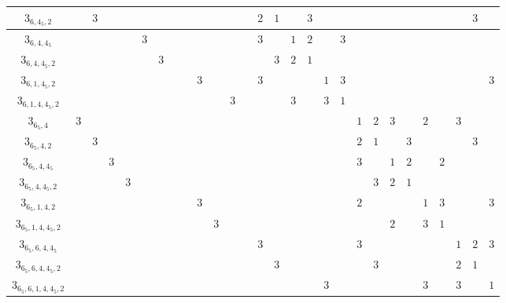 \documentclass{amsart}
\theoremstyle{definition}
\theoremstyle{remark}
\begin{document}
\begin{table}
{\begin{tabular}{|c||c|c|c|c|c|c|c|c|c|c|c|c|c|c|c|c|c|c|c|c|c|c|c|c|c|c|c|}
$3_{6,4_5,2}$ &  & $3$ &  &  &  &  &  &  &  &  &  &  & $2$ & $1$ &  & $3$ &  & & & & & & & & & $3$ & \\ \hline
$3_{6,4,4_5}$ &  &  &  &  & $3$ &  &  &  &  &  &  &  & $3$ &  & $1$ & $2$ &  & $3$ & & & & & & & & &\\ \hline
$3_{6,4,4_5,2}$ &  &  &  &  &  & $3$ &  &  &  &  &  &  &  & $3$ & $2$ & $1$ &  & & & & & & & & & & \\ \hline
$3_{6,1,4_5,2}$ &  &  &  &  &  &  &  &  & $3$ &  &  &  & $3$ &  &  &  & $1$ & $3$ & & & & & & & & & $3$\\ \hline
$3_{6,1,4,4_5,2}$ &  &  &  &  &  &  &  &  &  &  & $3$ &  &  &  & $3$ &  & $3$ & $1$ & & & & & & & & &\\ \hline
$3_{6_5,4}$ & $3$ & & & & & & & & & & & & & & & & & & $1$ & $2$ & $3$ & & $2$ & & $3$ & & \\ \hline
$3_{6_5,4,2}$ & & $3$ & & & & & & & & & & & & & & & & & $2$ & $1$ & & $3$ & & & & $3$ & \\ \hline
$3_{6_5,4,4_5}$ & & & $3$ & & & & & & & & & & & & & & & & $3$ & & $1$ & $2$ & & $2$ & & & \\ \hline
$3_{6_5,4,4_5,2}$ & & & & $3$ & & & & & & & & & & & & & & & & $3$ & $2$ & $1$ & & & & & \\ \hline
$3_{6_5,1,4,2}$ & & & & & & & & & $3$ & & & & & & & & & & $2$ & & & & $1$ & $3$ & & & $3$ \\ \hline
$3_{6_5,1,4,4_5,2}$ & & & & & & & & & & $3$ & & & & & & & & & & & $2$ & & $3$ & $1$ & & & \\ \hline
$3_{6_5,6,4,4_5}$ & & & & & & & & & & & & & $3$ & & & & & & $3$ & & & & & & $1$ & $2$ & $3$ \\ \hline
$3_{6_5,6,4,4_5,2}$ & & & & & & & & & & & & & & $3$ & & & & & & $3$ & & & & & $2$ & $1$ & \\ \hline
$3_{6_5,6,1,4,4_5,2}$ & & & & & & & & & & & & & & & & & $3$ & & & & & & $3$ & & $3$ & & $1$ \\ \hline
\end{tabular}
}

\vspace{20pt}


\end{table}
\end{document}
